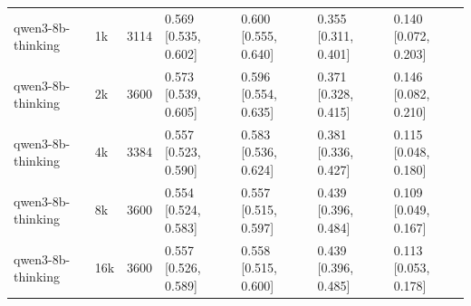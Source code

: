 \begin{table}
\begin{tabular}{llrllll}
qwen3-8b-thinking & 1k & 3114 & 0.569 [0.535, 0.602] & 0.600 [0.555, 0.640] & 0.355 [0.311, 0.401] & 0.140 [0.072, 0.203] \\
qwen3-8b-thinking & 2k & 3600 & 0.573 [0.539, 0.605] & 0.596 [0.554, 0.635] & 0.371 [0.328, 0.415] & 0.146 [0.082, 0.210] \\
qwen3-8b-thinking & 4k & 3384 & 0.557 [0.523, 0.590] & 0.583 [0.536, 0.624] & 0.381 [0.336, 0.427] & 0.115 [0.048, 0.180] \\
qwen3-8b-thinking & 8k & 3600 & 0.554 [0.524, 0.583] & 0.557 [0.515, 0.597] & 0.439 [0.396, 0.484] & 0.109 [0.049, 0.167] \\
qwen3-8b-thinking & 16k & 3600 & 0.557 [0.526, 0.589] & 0.558 [0.515, 0.600] & 0.439 [0.396, 0.485] & 0.113 [0.053, 0.178] \\
\bottomrule
\end{tabular}
\end{table}
